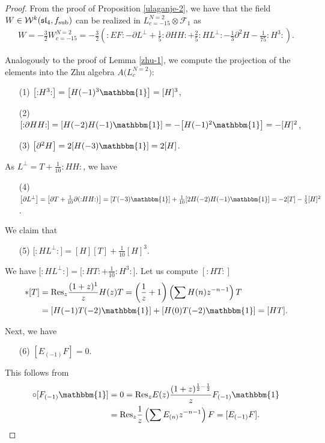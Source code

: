 \documentclass[pdftex]{sigma}
\numberwithin{equation}{section}
\newcommand{\F}{\mathcal F}
\begin{document}
 \begin{proof}
 	From the proof of Proposition \ref{ulaganje-2}, we have that the field $W \in \mathcal{W}^{k}(\mathfrak{sl}_4, f_{\rm sub})$ can be realized in $L^{N=2}_{c=-15} \otimes \F_{1}$ as
 	\begin{align*}
 W= -\frac{3}{2} W^{N=2}_{c=-15}
= -\frac{3}{2}\left({:}EF{:} - \partial L^{\perp}+ \frac{1}{5}{:}\partial H H {:} + \frac{2}{5}{:}HL^{\perp}{:} -\frac{1}{3}\partial^2H - \frac{1}{75}{:}H^3{:} \right).
 \end{align*}
 	
 	Analogously to the proof of Lemma \ref{zhu-1}, we compute the projection of the elements into the Zhu algebra $A\bigl(L_c^{N=2}\bigr)$:
 	\begin{enumerate}\itemsep=0pt
	\item[(1)] $\bigl[{:}H^3{:}\bigr]=\bigl[H(-1)^3\mathbbm{1}\bigr] = [H]^3$,
	\item[(2)] $[{:}\partial HH{:}] = [H(-2)H(-1)\mathbbm{1}] = -\bigl[H(-1)^2\mathbbm{1}\bigr] = -[H]^2$,
	\item[(3)] $\bigl[\partial ^2H\bigr] = 2[H(-3)\mathbbm{1}] = 2[H]$.
\end{enumerate}
As $ L^{\perp} = T + \frac{1}{10}{:}HH{:}$, we have
\begin{enumerate}\itemsep=0pt
 \item[(4)] $\bigl[\partial L^{\perp}\bigr] = \bigl[\partial T + \frac{1}{10}\partial ({:}HH{:})\bigr] = [T(-3)\mathbbm{1}] + \frac{1}{10}[2H(-2)H(-1)\mathbbm{1}] =-2[T] -\frac{1}{5}[H]^2 $.
\end{enumerate}	
We claim that
\begin{enumerate}\itemsep=0pt
 \item[(5)] $\bigl[{:}HL^{\perp}{:}\bigr] = [H][T]+\frac{1}{10}[H]^3$.
\end{enumerate}		
	
We have $\bigl[{:}HL^{\perp}{:}\bigr] = \bigl[{:}HT{:} + \frac{1}{10}{:}H^3{:}\bigr]$. Let us compute $[{:}HT{:}]$
\begin{align*}
		[H]*[T] &= \text{Res}_z \frac{(1+z)^1}{z}H(z)T = \left(\frac{1}{z} + 1\right)\left(\sum H(n)z^{-n-1}\right)T \\
		&= [H(-1)T(-2)\mathbbm{1}] + [H(0)T(-2)\mathbbm{1}] = [HT].
\end{align*}

Next, we have
\begin{enumerate}\itemsep=0pt
\item[(6)] $[E_{(-1)}F] = 0$.
\end{enumerate}
This follows from
	\begin{align*}
		[E_{(-1)} \mathbbm{1}] \circ [F_{(-1)} \mathbbm{1}] &= 0 = \text{Res}_z E (z)\frac{(1+z)^{{\frac{1}{2}} - \frac{1}{2}}}{z}F_{(-1)} \mathbbm{1} \\
		&= \text{Res}_z \frac{1}{z}\left(\sum E_{(n)}z^{-n-1}\right)F
		= [E_{(-1)}F].\tag*{\qed}
		\end{align*}\renewcommand{\qed}{}
\end{proof}
\end{document}
